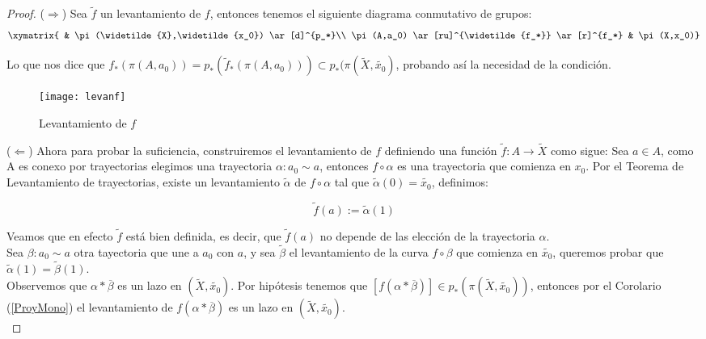 \begin{proof}

($\Rightarrow$) Sea $\widetilde{f}$ un levantamiento de $f$, entonces tenemos el siguiente diagrama conmutativo de grupos:\\ 


$$ \xymatrix{    & \pi(\widetilde{X},\widetilde{x_0}) \ar[d]^{p_*}\\
              \pi(A,a_0) \ar[ru]^{\widetilde{f_*}} \ar[r]^{f_*} & \pi(X,x_0)} $$



Lo que nos dice que $f_*(\pi(A,a_0))= p_*(\widetilde{f}_* (\pi(A,a_0))) \subset p_*(\pi(\widetilde{X},\widetilde{x_0})$, probando as\'i la necesidad de la condici\'on.\\


\begin{figure}[h]
\begin{center}
      \texttt{[image: levanf]}
\end{center}
\caption{Levantamiento de $f$}
\end{figure} 


($\Leftarrow$) Ahora para probar la suficiencia, construiremos el levantamiento de $f$ definiendo una funci\'on $\widetilde{f}:A \rightarrow \widetilde{X}$ como sigue: Sea $a \in A$, como A es conexo por trayectorias elegimos una trayectoria $\alpha: a_0 \sim a$, entonces $f \circ \alpha$ es una trayectoria que comienza en $x_0$. Por el Teorema de Levantamiento de trayectorias, existe un levantamiento $\widetilde{\alpha}$ de $f \circ \alpha$ tal que $\widetilde{\alpha}(0)=\widetilde{x_0}$, definimos:

$$ \widetilde{f}(a):= \widetilde{\alpha}(1)$$

Veamos que en efecto $\widetilde{f}$ est\'a bien definida, es decir, que $\widetilde{f}(a)$ no depende de las elecci\'on  de la trayectoria $\alpha$.\\
Sea $\beta: a_0 \sim a$ otra tayectoria que une a $a_0$ con $a$, y sea $\widetilde{\beta}$ el levantamiento de la curva $f \circ \beta$ que comienza en $\widetilde{x_0}$, queremos probar que $\widetilde{\alpha}(1) = \widetilde{\beta}(1)$.\\

Observemos que $\alpha * \overline{\beta}$ es un lazo en $(\widetilde{X},\widetilde{x_0})$. Por hip\'otesis tenemos que $[f(\alpha * \overline{\beta})] \in p_*(\pi(\widetilde{X},\widetilde{x_0}))$, entonces por el Corolario (\ref{ProyMono}) el levantamiento de $f(\alpha * \overline{\beta})$ es un lazo en $(\widetilde{X},\widetilde{x_0})$.\\


\end{proof}
